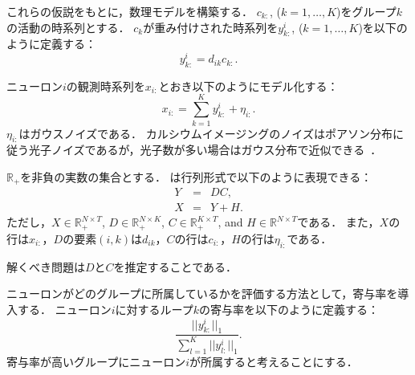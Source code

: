 これらの仮説をもとに，数理モデルを構築する．
$c_{k:}$, ($k=1,\dots,K$)をグループ$k$の活動の時系列とする．
$c_k$が重み付けされた時系列を$y^i_{k:}$, ($k = 1, \dots, K$)を以下のように定義する：
\begin{equation}
  y^i_{k:} = d_{ik} c_{k:}.
  \label{eq:y}
\end{equation}

ニューロン$i$の観測時系列を$x_{i:}$とおき以下のようにモデル化する：
\begin{equation}
  x_{i:} = \sum_{k=1}^K y^i_{k:} + \eta_{i:}.
  \label{eq:x}
\end{equation}
$\eta_{i:}$はガウスノイズである．
カルシウムイメージングのノイズはポアソン分布に従う光子ノイズであるが，光子数が多い場合はガウス分布で近似できる~\cite{Sjulson2007}．

$\mathbb{R}_+$を非負の実数の集合とする．
は行列形式で以下のように表現できる：
\begin{eqnarray}
  Y &=& DC, \\
  X &=& Y + H.
  \label{model_matrix}
\end{eqnarray}
ただし，$X \in \mathbb{R}_+^{N \times T}$, $D \in \mathbb{R}_+^{N \times K}$, $C \in \mathbb{R}_+^{K \times T}$, and $H \in \mathbb{R}^{N \times T}$である．
また，$X$の行は$x_{i:}$，$D$の要素$(i,k)$は$d_{ik}$，$C$の行は$c_{i:}$，$H$の行は$\eta_{i:}$である．

解くべき問題は$D$と$C$を推定することである．

ニューロンがどのグループに所属しているかを評価する方法として，寄与率を導入する．
ニューロン$i$に対するループ$k$の寄与率を以下のように定義する：
\begin{equation}
	\frac{|| y^i_{k:}||_1}{\sum_{l=1}^K || y^i_{l:} ||_1}.
  \label{eq:pov}
\end{equation}
寄与率が高いグループにニューロン$i$が所属すると考えることにする．
